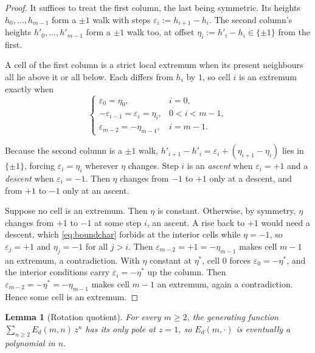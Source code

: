 \documentclass[11pt]{article}
\newtheorem{lemma}[theorem]{Lemma}
\theoremstyle{definition}
\theoremstyle{remark}
\begin{document}
\begin{proof}
It suffices to treat the first column, the last being symmetric. Its heights
$h_0,\dots,h_{m-1}$ form a $\pm1$ walk with steps $\varepsilon_i:=h_{i+1}-h_i$. The
second column's heights $h'_0,\dots,h'_{m-1}$ form a $\pm1$ walk too, at offset
$\eta_i:=h'_i-h_i\in\{\pm1\}$ from the first.

\medskip\noindent
A cell of the first column is a strict local extremum when its present neighbours
all lie above it or all below. Each differs from $h_i$ by $1$, so cell $i$ is an
extremum exactly when
\begin{equation}\label{eq:boundchar}
  \begin{cases}
    \varepsilon_0=\eta_0, & i=0,\\
    -\varepsilon_{i-1}=\varepsilon_i=\eta_i, & 0<i<m-1,\\
    \varepsilon_{m-2}=-\eta_{m-1}, & i=m-1.
  \end{cases}
\end{equation}

\medskip\noindent
Because the second column is a $\pm1$ walk,
$h'_{i+1}-h'_i=\varepsilon_i+(\eta_{i+1}-\eta_i)$ lies in $\{\pm1\}$, forcing
$\varepsilon_i=\eta_i$ wherever $\eta$ changes. Step $i$ is an \emph{ascent} when
$\varepsilon_i=+1$ and a \emph{descent} when $\varepsilon_i=-1$. Then $\eta$ changes from
$-1$ to $+1$ only at a descent, and from $+1$ to $-1$ only at an ascent.

\medskip\noindent
Suppose no cell is an extremum. Then $\eta$ is constant. Otherwise, by symmetry,
$\eta$ changes from $+1$ to $-1$ at some step $i$, an ascent. A rise back to $+1$
would need a descent, which \eqref{eq:boundchar} forbids at the interior cells while
$\eta=-1$, so $\varepsilon_j=+1$ and $\eta_j=-1$ for all $j>i$. Then
$\varepsilon_{m-2}=+1=-\eta_{m-1}$ makes cell $m-1$ an extremum, a contradiction.
With $\eta$ constant at $\eta^\ast$, cell $0$ forces $\varepsilon_0=-\eta^\ast$, and
the interior conditions carry $\varepsilon_i=-\eta^\ast$ up the column. Then
$\varepsilon_{m-2}=-\eta^\ast=-\eta_{m-1}$ makes cell $m-1$ an extremum, again a
contradiction. Hence some cell is an extremum.
\end{proof}

\begin{lemma}[Rotation quotient]\label{lem:quotient}
For every $m\ge2$, the generating function $\sum_{n\ge2}E_d(m,n)\,z^n$ has its only
pole at $z=1$, so $E_d(m,\cdot)$ is eventually a polynomial in $n$.
\end{lemma}
\end{document}
